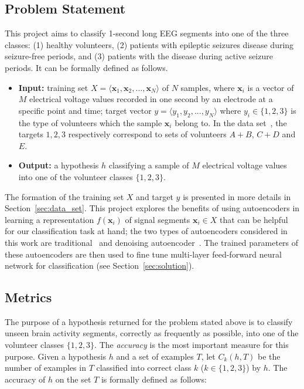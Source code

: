 \documentclass[12pt]{article}
\newcommand{\myvec}[1]{\mathbf{#1}}
\begin{document}
\subsection{Problem Statement}
\noindent
This project aims to classify 1-second long EEG segments into one of the three classes: (1) healthy volunteers, (2) patients with epileptic seizures disease during seizure-free periods, and (3) patients with the disease during active seizure periods. It can be formally defined as follows.

\begin{itemize}
\item \textbf{Input:} training set $X = \langle \myvec{x}_1, \myvec{x}_2, ..., \myvec{x}_N\rangle$ of $N$ samples, where $\myvec{x}_i$ is a vector of $M$ electrical voltage values recorded in one second by an electrode at a specific point and time; target vector $y = \langle y_1, y_2, ..., y_N \rangle$ where $y_i \in \{1, 2, 3\}$ is the type of volunteers which the sample $\myvec{x}_i$ belong to. In the data set~\cite{andrzejak2001indications}, the targets $1, 2, 3$ respectively correspond to sets of volunteers $A + B$, $C + D$ and $E$.
\item \textbf{Output:} a hypothesis $h$ classifying a sample of $M$ electrical voltage values into one of the volunteer classes $\{1, 2, 3\}$.
\end{itemize}

The formation of the training set $X$ and target $y$ is presented in more details in Section~\ref{sec:data_set}. This project explores the benefits of using autoencoders in learning a representation $f(\myvec{x}_i)$ of signal segments $\myvec{x}_i \in X$ that can be helpful for our classification task at hand; the two types of autoencoders considered in this work are traditional~\cite{bengio2007greedy} and denoising autoencoder~\cite{vincent2010stacked}. The trained parameters of these autoencoders are then used to fine tune multi-layer feed-forward neural network for classification (see Section~\ref{sec:solution}). %

\subsection{Metrics}
\label{sec:metric}
The purpose of a hypothesis returned for the problem stated above is to classify unseen brain activity segments, correctly as frequently as possible, into one of the volunteer classes $\{1, 2, 3\}$. The \textit{accuracy} is the most important measure for this purpose. Given a hypothesis $h$ and a set of examples $T$, let $C_k(h,T)$ be the number of examples in $T$ classified into correct class $k$ ($k \in \{1,2,3\}$) by $h$. The accuracy of $h$ on the set $T$ is formally defined as follows:
\end{document}
